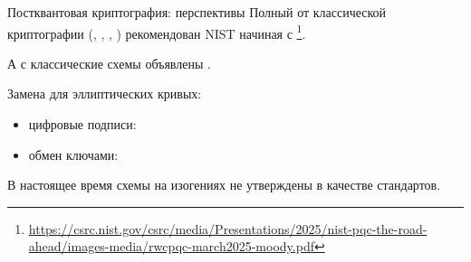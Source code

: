 \documentclass{beamer}
\begin{document}
\begin{frame}{Постквантовая криптография: перспективы}
	Полный  от классической криптографии (, , , ) рекомендован NIST начиная с \footnote{\url{https://csrc.nist.gov/csrc/media/Presentations/2025/nist-pqc-the-road-ahead/images-media/rwcpqc-march2025-moody.pdf}}.
	
	\vspace{0.5em}
	А с  классические схемы объявлены .
	
	\vspace{0.5em}
	
	Замена для эллиптических кривых:
	\begin{itemize}
		\item цифровые подписи:  \structure{$\rightarrow$} 
		\item обмен ключами:  \structure{$\rightarrow$} 
	\end{itemize}


\vspace{0.5em}
\structure{!} В настоящее время схемы на изогениях не утверждены в качестве стандартов.
\end{frame}
\end{document}
